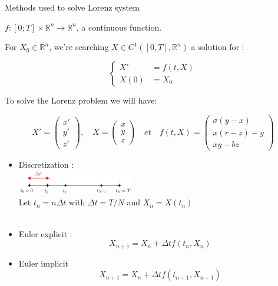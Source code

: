 \documentclass[10pt,xcolor={table,dvipsnames},t]{beamer}
\begin{document}
\begin{frame}[allowframebreaks]{Methods used to solve Lorenz system}
    
    $f : [0; T] \times \mathbb{R}^n \rightarrow \mathbb{R}^n$, \; a continuous function.

    For $X_0\in \mathbb{R}^n$, we're searching $X\in C^1([0,T],\mathbb{R}^n)$ a solution for :

    $$\left\{\begin{aligned}
        X'&=f(t,X) \\
        X(0)&=X_0
    \end{aligned}\right.$$

    To solve the Lorenz problem we will have:
    
    $$X'=\begin{pmatrix}
        x' \\
        y' \\
        z'
    \end{pmatrix}, \quad X=\begin{pmatrix}
        x \\
        y \\
        z
    \end{pmatrix} \quad et \quad f(t,X)=\begin{pmatrix}
        \sigma(y-x) \\
        x(r-z)-y \\
        xy-bz
    \end{pmatrix}$$
    
    \newpage
    
    \begin{itemize}
        \item Discretization : \\
        \quad \includegraphics[width=0.4\textwidth]{images/discretization.jpg} \\ 
        Let \quad $t_n=n\Delta t$ \quad with \quad $\Delta t=T/N$ \quad and \quad $X_n=X(t_n)$ \\ \; \\
        \item Euler explicit :
        $$X_{n+1}=X_n+\Delta t f(t_n,X_n)$$
        \item Euler implicit
        $$X_{n+1}=X_n+\Delta t f(t_{n+1},X_{n+1})$$
        
        \newpage
        

\end{itemize}
\end{frame}
\end{document}
